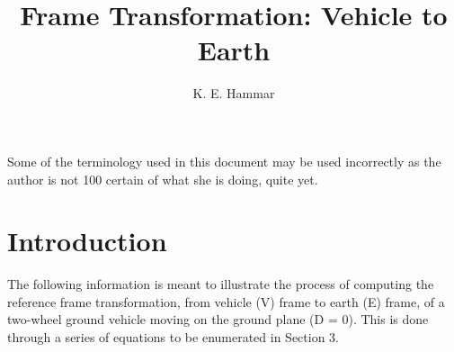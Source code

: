 \documentclass[12pt]{article}
\begin{document}
	\title{Frame Transformation: Vehicle to Earth}
	\author{K. E. Hammar}
	\maketitle
	Some of the terminology used in this document may be used incorrectly as the author is not 100\text{\%} certain of what she is doing, quite yet. \\
	\section{Introduction}
		The following information is meant to illustrate the process of computing the reference frame transformation, from vehicle (V) frame to earth (E) frame, of a two-wheel ground vehicle moving on the ground plane (D = 0). This is done through a series of equations to be enumerated in Section 3.\\
\end{document}
